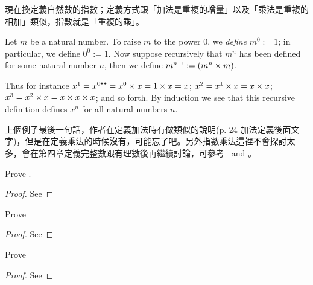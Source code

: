 \begin{note}
現在換定義自然數的指數；定義方式跟「加法是重複的增量」以及「乘法是重複的相加」類似，指數就是「重複的乘」。
\end{note}

\begin{definition} \label{def 2.3.11}
Let \(m\) be a natural number. To raise \(m\) to the power \(0\), we \emph{define} \(m^0 := 1\); in particular, we define \(0^0 := 1\). Now suppose recursively that \(m^n\) has been defined for some natural number \(n\), then we define \(m^{n\texttt{++}} := (m^n \times m)\).
\end{definition}

\begin{example}\label{example 2.3.12}
Thus for instance \(x^1 = x^{0\texttt{++}} = x^0 \times x = 1 \times x = x\); \(x^2 = x^1 \times x = x \times x\); \(x^3 = x^2 \times x = x \times x \times x\); and so forth. By induction we see that this recursive definition defines \(x^n\) for all natural numbers \(n\).
\end{example}
\begin{note}
上個例子最後一句話，作者在定義加法時有做類似的說明(p. 24 加法定義後面文字)，但是在定義乘法的時候沒有，可能忘了吧。另外指數乘法這裡不會探討太多，會在第四章定義完整數跟有理數後再繼續討論，可參考\  and 。
\end{note}

\exercisesection

\begin{exercise}\label{exercise 2.3.1}
    Prove .
\end{exercise}
\begin{proof}
    See 
\end{proof}

\begin{exercise}\label{exercise 2.3.2}
    Prove 
\end{exercise}
\begin{proof}
    See 
\end{proof}

\begin{exercise}\label{exercise 2.3.3}
    Prove 
\end{exercise}
\begin{proof}
    See 
\end{proof}

